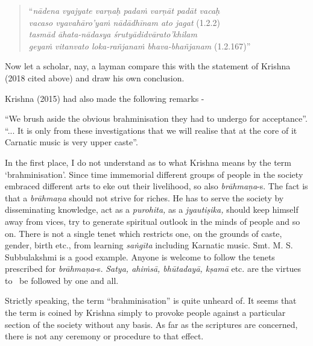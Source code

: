 \begin{verse}
“\textit{nādena vyajyate varṇaḥ padaṁ varṇāt padāt vacaḥ} \\ \textit{vacaso vyavahāro’yaṁ nādādhīnam ato jagat}  (1.2.2)\\ \textit{tasmād āhata-nādasya śrutyādidvārato’khilam} \\ \textit{geyaṁ vitanvato loka-rañjanaṁ bhava-bhañjanam}  (1.2.167)”
\end{verse}

Now let a scholar, nay, a layman compare this with the statement of Krishna (2018 cited above) and draw his own conclusion.

Krishna (2015) had also made the following remarks -  

\begin{myquote}
“We brush aside the obvious brahminisation they had to undergo for acceptance”. “... It is only from these investigations that we will realise that at the core of it Carnatic music is very upper caste”.
\end{myquote}

In the first place, I do not understand as to what Krishna means by the term ‘brahminisation’. Since time immemorial different groups of people in the society embraced different arts to eke out their livelihood, so also \textit{brāhmaṇa}-s. The fact is that a \textit{brāhmaṇa} should not strive for riches. He has to serve the society by disseminating knowledge, act as a \textit{purohita,} as a \textit{jyautiṣika,} should keep himself away from vices, try to generate spiritual outlook in the minds of people and so on. There is not a single tenet which restricts one, on the grounds of caste, gender, birth etc., from learning \textit{saṅgīta} including Karnatic music. Smt. M. S. Subbulakshmi is a good example. Anyone is welcome to follow the tenets prescribed for \textit{brāhmaṇa}-s. \textit{Satya, ahiṁsā, bhūtadayā, kṣamā} etc. are the virtues to  be followed by one and all. 

Strictly speaking, the term “brahminisation” is quite unheard of. It seems that the term is coined by Krishna simply to provoke people against a particular section of the society without any basis. As far as the scriptures are concerned, there is not any ceremony or procedure to that effect.

\newpage

